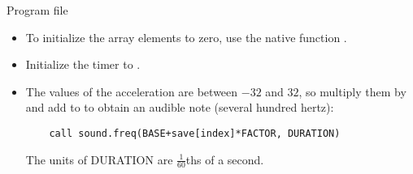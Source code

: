 
{\raggedleft \hfill Program file }

\begin{itemize}
\item To initialize the array elements to zero, use the native function .
\item Initialize the timer to .
\item The values of the acceleration are between $-32$ and $32$,
so multiply them by  and add to  to obtain
an audible note (several hundred hertz):
\begin{verbatim}
    call sound.freq(BASE+save[index]*FACTOR, DURATION)
\end{verbatim}
The units of DURATION are $\frac{1}{60}$ths of a second.
\end{itemize}


